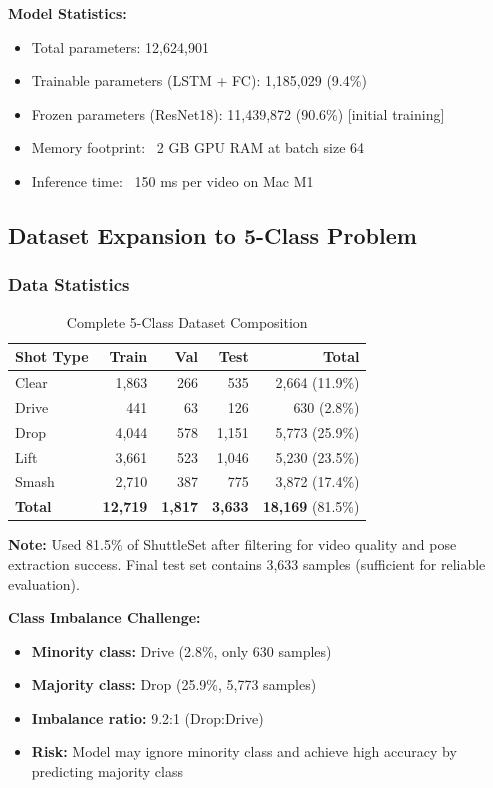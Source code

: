 \documentclass[11pt,a4paper]{article}
\begin{document}
\textbf{Model Statistics:}
\begin{itemize}
\item Total parameters: 12,624,901
\item Trainable parameters (LSTM + FC): 1,185,029 (9.4\%)
\item Frozen parameters (ResNet18): 11,439,872 (90.6\%) [initial training]
\item Memory footprint: ~2 GB GPU RAM at batch size 64
\item Inference time: ~150 ms per video on Mac M1
\end{itemize}

\subsection{Dataset Expansion to 5-Class Problem}

\subsubsection{Data Statistics}

\begin{table}[H]
\centering
\caption{Complete 5-Class Dataset Composition}
\begin{tabular}{lrrrr}
\toprule
Shot Type & Train & Val & Test & Total \\
\midrule
Clear & 1,863 & 266 & 535 & 2,664 (11.9\%) \\
Drive & 441 & 63 & 126 & 630 (2.8\%) \\
Drop & 4,044 & 578 & 1,151 & 5,773 (25.9\%) \\
Lift & 3,661 & 523 & 1,046 & 5,230 (23.5\%) \\
Smash & 2,710 & 387 & 775 & 3,872 (17.4\%) \\
\midrule
\textbf{Total} & \textbf{12,719} & \textbf{1,817} & \textbf{3,633} & \textbf{18,169} (81.5\%) \\
\bottomrule
\end{tabular}
\end{table}

\textbf{Note:} Used 81.5\% of ShuttleSet after filtering for video quality and pose extraction success. Final test set contains 3,633 samples (sufficient for reliable evaluation).

\textbf{Class Imbalance Challenge:}
\begin{itemize}
\item \textbf{Minority class:} Drive (2.8\%, only 630 samples)
\item \textbf{Majority class:} Drop (25.9\%, 5,773 samples)
\item \textbf{Imbalance ratio:} 9.2:1 (Drop:Drive)
\item \textbf{Risk:} Model may ignore minority class and achieve high accuracy by predicting majority class
\end{itemize}
\end{document}
